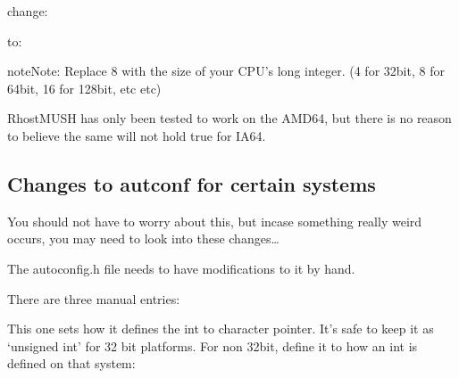 \documentclass[letterpaper,10pt,english]{sphinxmanual}
\begin{document}
\sphinxAtStartPar
change:

\begin{sphinxVerbatim}[commandchars=\\\{\}]
      
              
\end{sphinxVerbatim}

\sphinxAtStartPar
to:

\begin{sphinxVerbatim}[commandchars=\\\{\}]
     
             
\end{sphinxVerbatim}

\begin{sphinxadmonition}{note}{Note:}
\sphinxAtStartPar
Replace 8 with the size of your CPU’s long integer. (4 for 32\sphinxhyphen{}bit,
8 for 64\sphinxhyphen{}bit, 16 for 128\sphinxhyphen{}bit, etc etc)
\end{sphinxadmonition}

\sphinxAtStartPar
RhostMUSH has only been tested to work on the AMD64, but there is no
reason to believe the same will not hold true for IA64.


\subsection{Changes to autconf for certain systems}
\label{\detokenize{troubleshooting:changes-to-autconf-for-certain-systems}}
\sphinxAtStartPar
You should not have to worry about this, but incase something really
weird occurs, you may need to look into these changes…

\sphinxAtStartPar
The autoconfig.h file needs to have modifications to it by hand.

\sphinxAtStartPar
There are three manual entries:

\sphinxAtStartPar
This one sets how it defines the int to character pointer.  It’s safe
to keep it as ‘unsigned int’ for 32 bit platforms.  For non 32\sphinxhyphen{}bit,
define it to  how an int is defined on that system:

\begin{sphinxVerbatim}[commandchars=\\\{\}]
      
\end{sphinxVerbatim}
\end{document}
